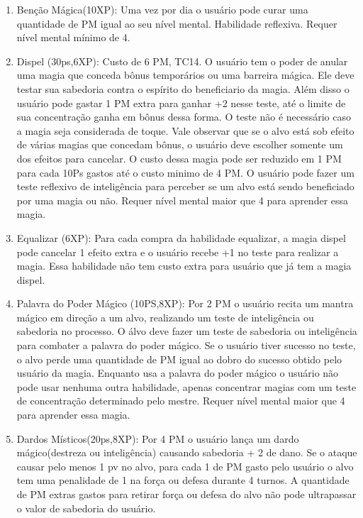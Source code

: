 \begin{enumerate}
		 	\item Benção Mágica(10XP): Uma vez por dia o usuário pode curar uma quantidade de PM igual ao seu nível mental. Habilidade reflexiva. Requer nível mental mínimo de 4.
 
		
		 	\item Dispel (30ps,6XP): Custo de 6 PM, TC14.\newline
O usuário tem o poder de anular uma magia que conceda bônus temporários ou uma barreira mágica. Ele deve testar sua sabedoria contra o espírito do beneficiario da magia. Além disso o usuário pode gastar 1 PM extra para ganhar +2 nesse teste, até o limite de sua concentração ganha em bônus dessa forma. O teste não é necessário caso a magia seja considerada de toque. Vale observar que se o alvo está sob efeito de várias magias que concedam bônus, o usuário deve escolher somente um dos efeitos para cancelar. O custo dessa magia pode ser reduzido em 1 PM para cada 10Ps gastos até o custo minimo de 4 PM. O usuário pode fazer um teste reflexivo de inteligência para perceber se um alvo está sendo beneficiado por uma magia ou não. Requer nível mental maior que 4 para aprender essa magia.

		 	\item Equalizar (6XP): Para cada compra da habilidade equalizar, a magia dispel pode cancelar 1 efeito extra e o usuário recebe +1 no teste para realizar a magia. Essa habilidade não tem custo extra para usuário que já tem a magia dispel.

 	\item Palavra do Poder Mágico (10PS,8XP): Por 2 PM o usuário recita um mantra mágico em direção a um alvo, realizando um teste de inteligência ou sabedoria no processo. O álvo deve fazer um teste de sabedoria ou inteligência para combater a palavra do poder mágico. Se o usuário tiver sucesso no teste, o alvo perde uma quantidade de PM igual ao dobro do sucesso obtido pelo usuário da magia. Enquanto usa a palavra do poder mágico o usuário não pode usar nenhuma outra habilidade, apenas concentrar magias com um teste de concentração determinado pelo mestre. Requer nível mental maior que 4 para aprender essa magia.

  	 	\item Dardos Místicos(20ps,8XP): Por 4 PM o usuário lança um dardo mágico(destreza ou inteligência) causando sabedoria + 2 de dano. Se o ataque causar pelo menos 1 pv no alvo, para cada 1 de PM gasto pelo usuário o alvo tem uma penalidade de 1 na força ou defesa durante 4 turnos. A quantidade de PM extras gastos para retirar força ou defesa do alvo não pode ultrapassar o valor de sabedoria do usuário.
  

\end{enumerate}
